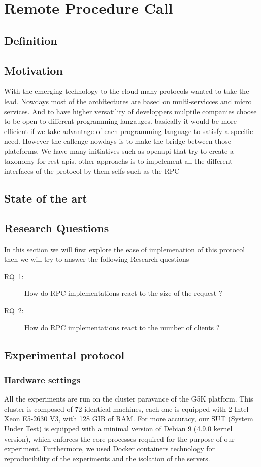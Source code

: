 \section{Remote Procedure Call}

\subsection{Definition}

\subsection{Motivation}
With the emerging technology to the cloud many protocols wanted to take the lead.
Nowdays most of the architectures are based on multi-servicces and micro services.
And to have higher versatility of developpers mulptile companies choose to be open to different programming langauges. basically it would be more efficient if we take advantage of each programming language to satisfy a specific need.
However the callenge nowdays is to make the bridge between those plateforms.
We have many initiatives such as openapi that try to create a taxonomy for rest apis.
other approachs is to impelement all the different interfaces of the protocol by them selfs such as the RPC
\subsection{State of the art}

\subsection{Research Questions}
In this section we will first explore the ease of implemenation of this protocol
then we will try to answer the following Research questions

\begin{description}
    \item[\textsc{RQ}~1:] How do RPC implementations react to the size of the request ?
    \item[\textsc{RQ}~2:] How do RPC implementations react to the number of clients ?

\end{description}
\subsection{Experimental protocol}
\subsubsection{Hardware settings}
All the experiments are run on the cluster paravance of the G5K platform. This cluster is composed of 72 identical machines, each one is equipped with 2 Intel Xeon E5-2630 V3, with 128 GIB of RAM. For more accuracy, our SUT (System Under Test) is equipped with a minimal version of Debian 9 (4.9.0 kernel version), which enforces the core processes required for the purpose of our experiment. Furthermore, we used Docker containers technology for reproducibility of the experiments and the isolation of the servers.
